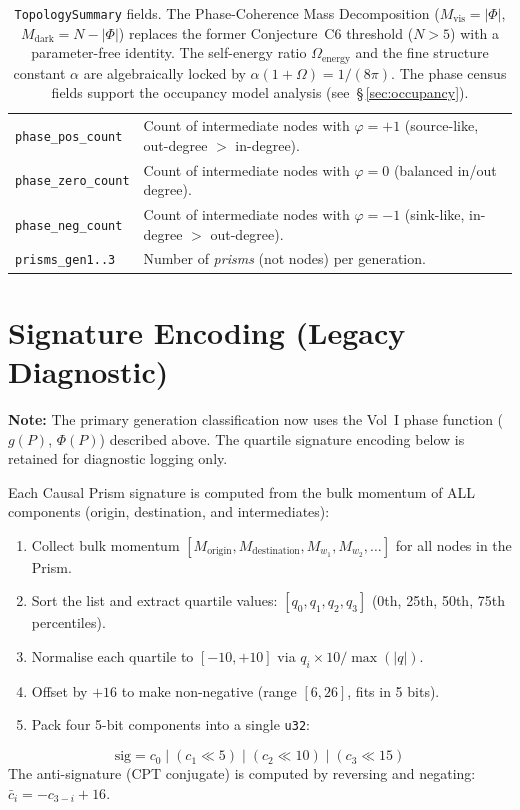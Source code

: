 \documentclass[11pt, a4paper, openany]{book}
\newcommand{\code}[1]{\texttt{#1}}
\begin{document}
\begin{table}[H]
\begin{tabular}{@{} l p{9cm} @{}}
\code{phase\_pos\_count}    & Count of intermediate nodes with $\varphi = +1$ (source-like, out-degree $>$ in-degree). \\
\code{phase\_zero\_count}   & Count of intermediate nodes with $\varphi = 0$ (balanced in/out degree). \\
\code{phase\_neg\_count}    & Count of intermediate nodes with $\varphi = -1$ (sink-like, in-degree $>$ out-degree). \\
\code{prisms\_gen1..3}      & Number of \emph{prisms} (not nodes) per generation. \\
\bottomrule
\end{tabular}
\caption{\code{TopologySummary} fields.  The Phase-Coherence Mass Decomposition
($M_\text{vis} = |\Phi|$, $M_\text{dark} = N - |\Phi|$) replaces the former
Conjecture~C6 threshold ($N > 5$) with a parameter-free identity.  The
self-energy ratio $\Omega_{\mathrm{energy}}$ and the fine structure constant
$\alpha$ are algebraically locked by $\alpha(1+\Omega) = 1/(8\pi)$.
The phase census fields support the occupancy model analysis
(see~\S\,\ref{sec:occupancy}).}
\end{table}

\section{Signature Encoding (Legacy Diagnostic)}

\textbf{Note:} The primary generation classification now uses the Vol~I
phase function ($g(P)$, $\Phi(P)$) described above.  The quartile signature
encoding below is retained for diagnostic logging only.

Each Causal Prism signature is computed from the bulk momentum of ALL
components (origin, destination, and intermediates):
\begin{enumerate}
  \item Collect bulk momentum $[M_{\text{origin}}, M_{\text{destination}},
        M_{w_1}, M_{w_2}, \dots]$ for all nodes in the Prism.
  \item Sort the list and extract quartile values: $[q_0, q_1, q_2, q_3]$
        (0th, 25th, 50th, 75th percentiles).
  \item Normalise each quartile to $[-10, +10]$ via $q_i \times 10 / \max(|q|)$.
  \item Offset by $+16$ to make non-negative (range $[6, 26]$, fits in 5 bits).
  \item Pack four 5-bit components into a single \code{u32}:
\end{enumerate}
\[
  \text{sig} = c_0 \mathbin{|} (c_1 \ll 5) \mathbin{|} (c_2 \ll 10) \mathbin{|} (c_3 \ll 15)
\]
The anti-signature (CPT conjugate) is computed by reversing and negating:
$\bar{c}_i = -c_{3-i} + 16$.
\end{document}
